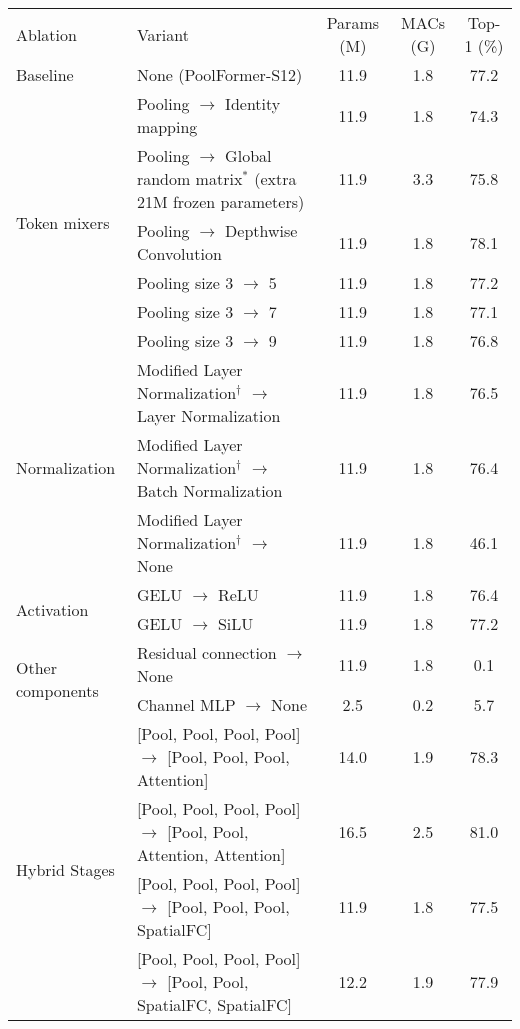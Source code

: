 \begin{tabular}{l|l|c c c}
\toprule
	Ablation & Variant & Params (M) & MACs (G) & Top-1 (\%) \\
\whline
Baseline & None (PoolFormer-S12) & 11.9 & 1.8 & 77.2 \\
\hline
\multirow{6}{*}{Token mixers}  & Pooling $\rightarrow$ Identity mapping & 11.9 & 1.8 & 74.3 \\
             & Pooling $\rightarrow$ Global random matrix$^*$ (extra 21M frozen
parameters) & 11.9 & 3.3 & 75.8 \\
             & Pooling $\rightarrow$ Depthwise Convolution \cite{chollet2017xception, mamalet2012simplifying} & 11.9 & 1.8 & 78.1 \\
             & Pooling size 3 $\rightarrow$ 5 & 11.9 & 1.8 & 77.2 \\
             & Pooling size 3 $\rightarrow$ 7 & 11.9 & 1.8 & 77.1 \\
             & Pooling size 3 $\rightarrow$ 9 & 11.9 & 1.8 & 76.8 \\
\hline
\multirow{3}{*}{Normalization}  & Modified Layer Normalization$^\dag$ $\rightarrow$  Layer Normalization \cite{layer_norm} & 11.9 & 1.8 & 76.5 \\
             & Modified Layer Normalization$^\dag$ $\rightarrow$ Batch Normalization \cite{batch_norm} & 11.9 & 1.8 & 76.4 \\
             & Modified Layer Normalization$^\dag$ $\rightarrow$ None & 11.9 & 1.8 & 46.1 \\
\hline
\multirow{2}{*}{Activation}  & GELU \cite{gelu} $\rightarrow$  ReLU \cite{relu}  & 11.9 & 1.8 & 76.4 \\
             & GELU $\rightarrow$ SiLU \cite{silu} & 11.9 & 1.8 & 77.2 \\
\hline
\multirow{2}{*}{Other components}  & Residual connection \cite{gelu} $\rightarrow$  None  & 11.9 & 1.8 & 0.1 \\
             & Channel MLP $\rightarrow$ None & 2.5 & 0.2 & 5.7 \\
\hline
\multirow{4}{*}{Hybrid Stages}  & [Pool, Pool, Pool, Pool] $\rightarrow$  [Pool, Pool,                                 Pool, Attention] & 14.0 & 1.9 & 78.3 \\
                                & [Pool, Pool, Pool, Pool] $\rightarrow$  [Pool, Pool, Attention, Attention]  & 16.5 & 2.5 & 81.0 \\
                                & [Pool, Pool, Pool, Pool] $\rightarrow$  [Pool, Pool, Pool, SpatialFC] & 11.9 & 1.8 & 77.5  \\
                                & [Pool, Pool, Pool, Pool] $\rightarrow$  [Pool, Pool, SpatialFC, SpatialFC] & 12.2 & 1.9 & 77.9 \\
             
\bottomrule
\end{tabular}